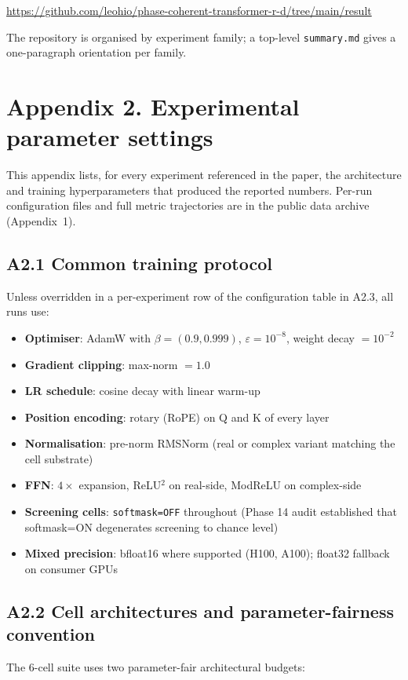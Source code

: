 \documentclass[11pt,a4paper]{article}
\theoremstyle{plain}
\theoremstyle{definition}
\begin{document}
\url{https://github.com/leohio/phase-coherent-transformer-r-d/tree/main/result}

The repository is organised by experiment family; a top-level \texttt{summary.md} gives a one-paragraph orientation per family.

\medskip

\section*{Appendix 2. Experimental parameter settings}
\label{app:hyperparams}

This appendix lists, for every experiment referenced in the paper, the architecture and training hyperparameters that produced the reported numbers. Per-run configuration files and full metric trajectories are in the public data archive (Appendix~1).

\subsection*{A2.1 Common training protocol}
Unless overridden in a per-experiment row of the configuration table in A2.3, all runs use:

\begin{itemize}
  \item \textbf{Optimiser}: AdamW with $\beta = (0.9, 0.999)$, $\varepsilon = 10^{-8}$, weight decay $= 10^{-2}$
  \item \textbf{Gradient clipping}: max-norm $= 1.0$
  \item \textbf{LR schedule}: cosine decay with linear warm-up
  \item \textbf{Position encoding}: rotary (RoPE) on Q and K of every layer
  \item \textbf{Normalisation}: pre-norm RMSNorm (real or complex variant matching the cell substrate)
  \item \textbf{FFN}: $4{\times}$ expansion, ReLU$^2$ on real-side, ModReLU on complex-side
  \item \textbf{Screening cells}: \texttt{softmask=OFF} throughout (Phase 14 audit established that softmask=ON degenerates screening to chance level)
  \item \textbf{Mixed precision}: bfloat16 where supported (H100, A100); float32 fallback on consumer GPUs
\end{itemize}

\subsection*{A2.2 Cell architectures and parameter-fairness convention}
The 6-cell suite uses two parameter-fair architectural budgets:
\end{document}
